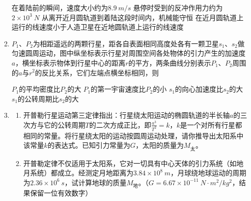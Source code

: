 \begin{enumerate}[leftmargin=0em]
\fourchoices
{在着陆前的瞬间，速度大小约为$ 8.9 \ m/s $}
{悬停时受到的反冲作用力约为$ 2 \times 10^3 \ N $}
{从离开近月圆轨道到着陆这段时间内，机械能守恒}
{在近月圆轨道上运行的线速度小于人造卫星在近地圆轨道上运行的线速度}


\item
{}
$ P_{1} $、$ P_{2} $为相距遥远的两颗行星，距各自表面相同高度处各有一颗卫星$ s_{1} $、$ s_{2} $做匀速圆周运动，图中纵坐标表示行星对周围空间各处物体的引力产生的加速度$ a $，横坐标表示物体到行星中心的距离$ r $的平方，两条曲线分别表示$ P_{1} $、$ P_{2} $周围的$ a $与$ r^{2} $的反比关系，它们左端点横坐标相同，则  
\begin{figure}[h!]
\centering

\end{figure}


\fourchoices
{$ P_{1} $的平均密度比$ P_{2} $的大}
{$ P_{1} $的第一宇宙速度比$ P_{2} $的小}
{$ s_{1} $的向心加速度比$ s_{2} $的大}
{$ s_{1} $的公转周期比$ s_{2} $的大}



\item 
{}
\begin{enumerate}
\renewcommand{\labelenumi}{\arabic{enumi}.}
\item
开普勒行星运动第三定律指出：行星绕太阳运动的椭圆轨道的半长轴$ a $的三次方与它的公转周期$ T $的二次方成正比，即$\frac { a ^ { 3 } } { T ^ { 2 } } = k$，$ k $是一个对所有行星都相同的常量。将行星绕太阳的运动按圆周运动处理，请你推导出太阳系中该常量$ k $的表达式。已知引力常量为$ G $，太阳的质量为$ M_{ \text{太} } $。
\item 
开普勒定律不仅适用于太阳系，它对一切具有中心天体的引力系统（如地月系统）都成立。经测定月地距离为$ 3.84 \times 10^8\ m $，月球绕地球运动的周期为$ 2.36 \times 10^6\ s $，试计算地球的质量$ M_{ \text{地} } $。（$ G=6.67 \times 10^{-11} \ N \cdot m^{2} /kg^{2} $，结果保留一位有效数字）



\end{enumerate}

\end{enumerate}
